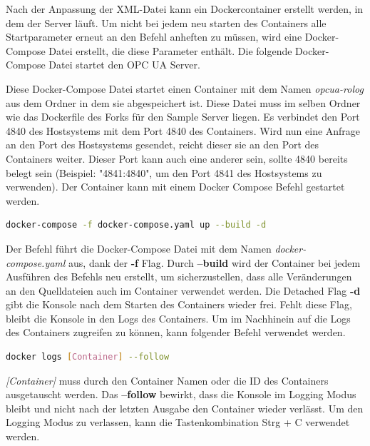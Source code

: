 \documentclass[a4paper, 12pt, oneside, toc=listofnumbered, bibliography=totoc]{scrbook}
\begin{document}
		Nach der Anpassung der XML-Datei kann ein Dockercontainer erstellt werden, in dem der Server läuft. Um nicht bei jedem neu starten des Containers alle Startparameter erneut an den Befehl anheften zu müssen, wird eine Docker-Compose Datei erstellt, die diese Parameter enthält. Die folgende Docker-Compose Datei startet den OPC UA Server.
		
		
		
		Diese Docker-Compose Datei startet einen Container mit dem Namen \textit{opcua-rolog} aus dem Ordner in dem sie abgespeichert ist. Diese Datei muss im selben Ordner wie das Dockerfile des Forks für den Sample Server liegen. Es verbindet den Port 4840 des Hostsystems mit dem Port 4840 des Containers. Wird nun eine Anfrage an den Port des Hostsystems gesendet, reicht dieser sie an den Port des Containers weiter. Dieser Port kann auch eine anderer sein, sollte 4840 bereits belegt sein (Beispiel: "4841:4840", um den Port 4841 des Hostsystems zu verwenden). Der Container kann mit einem Docker Compose Befehl gestartet werden. 
	
		\begin{lstlisting}[numbers=none, language=bash, frame=single]
			docker-compose -f docker-compose.yaml up --build -d
		\end{lstlisting}
	
		Der Befehl führt die Docker-Compose Datei mit dem Namen \textit{docker-compose.yaml} aus, dank der \textbf{-f} Flag. Durch \textbf{--build} wird der Container bei jedem Ausführen des Befehls neu erstellt, um sicherzustellen, dass alle Veränderungen an den Quelldateien auch im Container verwendet werden. Die Detached Flag \textbf{-d} gibt die Konsole nach dem Starten des Containers wieder frei. Fehlt diese Flag, bleibt die Konsole in den Logs des Containers. Um im Nachhinein auf die Logs des Containers zugreifen zu können, kann folgender Befehl verwendet werden. 
		
		\begin{lstlisting}[numbers=none, language=bash, frame=single]
			docker logs [Container] --follow
		\end{lstlisting}
		
		\textit{[Container]} muss durch den Container Namen oder die ID des Containers ausgetauscht werden. Das \textbf{--follow} bewirkt, dass die Konsole im Logging Modus bleibt und nicht nach der letzten Ausgabe den Container wieder verlässt. Um den Logging Modus zu verlassen, kann die Tastenkombination Strg + C verwendet werden.
		
\end{document}
